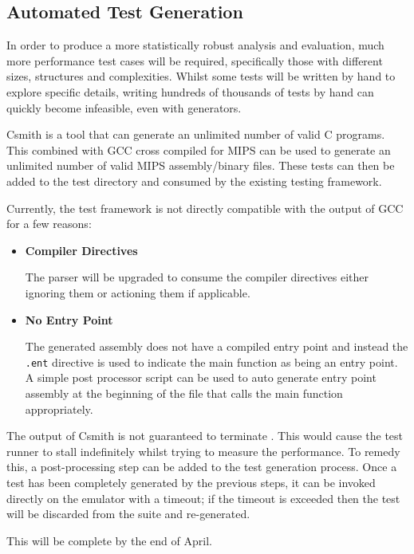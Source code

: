 \subsection{Automated Test Generation}

In order to produce a more statistically robust analysis and evaluation, much more performance test cases will be required, specifically those with different sizes, structures and complexities. Whilst some tests will be written by hand to explore specific details, writing hundreds of thousands of tests by hand can quickly become infeasible, even with generators.

Csmith \cite{csmith} is a tool that can generate an unlimited number of valid C programs. This combined with GCC \cite{gcc} cross compiled for MIPS \cite{mips-gcc} can be used to generate an unlimited number of valid MIPS assembly/binary files. These tests can then be added to the test directory and consumed by the existing testing framework.

Currently, the test framework is not directly compatible with the output of GCC for a few reasons:

\begin{itemize}
    \item \textbf{Compiler Directives}
    
    The parser will be upgraded to consume the compiler directives either ignoring them or actioning them if applicable.

    \item \textbf{No Entry Point}
    
    The generated assembly does not have a compiled entry point and instead the \texttt{.ent} directive is used to indicate the main function as being an entry point. A simple post processor script can be used to auto generate entry point assembly at the beginning of the file that calls the main function appropriately.
\end{itemize}

The output of Csmith is not guaranteed to terminate \cite{csmith-paper}. This would cause the test runner to stall indefinitely whilst trying to measure the performance. To remedy this, a post-processing step can be added to the test generation process. Once a test has been completely generated by the previous steps, it can be invoked directly on the emulator with a timeout; if the timeout is exceeded then the test will be discarded from the suite and re-generated.

This will be complete by the end of April.